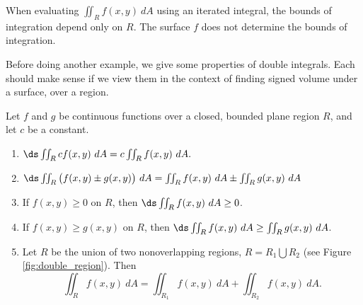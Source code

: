 {When evaluating $\iint_Rf(x,y)\ dA$ using an iterated integral, the bounds of integration depend only on $R$. The surface $f$ does not determine the bounds of integration.
}

Before doing another example, we give some properties of double integrals. Each should make sense if we view them in the context of finding signed volume under a surface, over a region.

{Let $f$ and $g$ be continuous functions over a closed, bounded plane region $R$, and let $c$ be a constant.
\begin{enumerate}
	\item $\ds \iint_Rcf(x,y)\ dA = c\iint_Rf(x,y)\ dA.$
	\item	$\ds \iint_R \big(f(x,y)\pm g(x,y)\big)\ dA = \iint_R f(x,y)\ dA \pm \iint_R g(x,y)\ dA $
	\item	If $f(x,y)\geq 0$ on $R$, then $\ds \iint_R f(x,y)\ dA\geq 0$.
	\item	If $f(x,y)\geq g(x,y)$ on $R$, then $\ds \iint_R f(x,y)\ dA\geq \iint_R g(x,y)\ dA$.
	\item \label{thm:double_prop_regions}	Let $R$ be the union of two nonoverlapping regions, $R = R_1\bigcup R_2$ (see Figure \ref{fig:double_region}). Then 
	$$\iint_R f(x,y)\ dA = \iint_{R_1}f(x,y)\ dA+ \iint_{R_2}f(x,y)\ dA.$$
\end{enumerate}
}

